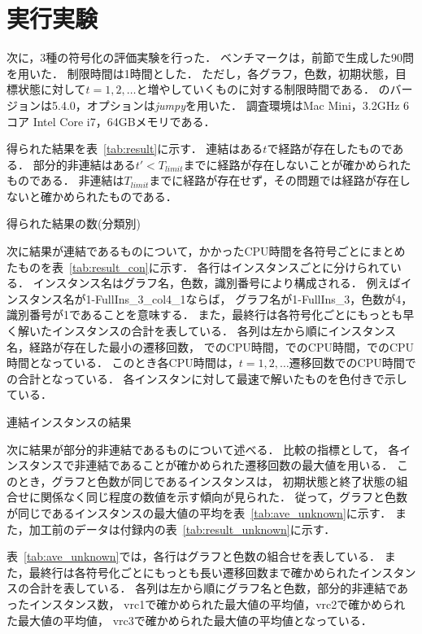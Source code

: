 \section{実行実験}
次に，3種の符号化の評価実験を行った．
ベンチマークは，前節で生成した90問を用いた．
制限時間は1時間とした．
ただし，各グラフ，色数，初期状態，目標状態に対して$t=1, 2, \dots$と増やしていくものに対する制限時間である．
{\clingo}のバージョンは5.4.0，オプションは\textsl{jumpy}を用いた．
調査環境はMac Mini，3.2GHz 6コア Intel Core i7，64GBメモリである．

得られた結果を表~\ref{tab:result}に示す．
連結はある$t$で経路が存在したものである．
部分的非連結はある$t' < T_{limit}$までに経路が存在しないことが確かめられたものである．
非連結は$T_{limit}$までに経路が存在せず，その問題では経路が存在しないと確かめられたものである．

\begin{table}
  \centering
  \caption{得られた結果の数(分類別)}
  
  \label{tab:result}
\end{table}

次に結果が連結であるものについて，かかったCPU時間を各符号ごとにまとめたものを表~\ref{tab:result_con}に示す．
各行はインスタンスごとに分けられている．
インスタンス名はグラフ名，色数，識別番号により構成される．
例えばインスタンス名が1-FullIns\_3\_col4\_1ならば，
グラフ名が1-FullIns\_3，色数が4，識別番号が1であることを意味する．
また，最終行は各符号化ごとにもっとも早く解いたインスタンスの合計を表している．
各列は左から順にインスタンス名，経路が存在した最小の遷移回数，
でのCPU時間，でのCPU時間，でのCPU時間となっている．
このとき各CPU時間は，$t=1, 2, \dots $遷移回数でのCPU時間での合計となっている．
各インスタンに対して最速で解いたものを色付きで示している．

\begin{table}
  \centering
  \caption{連結インスタンスの結果}
  
  \label{tab:result_con}
\end{table}

次に結果が部分的非連結であるものについて述べる．
比較の指標として，
各インスタンスで非連結であることが確かめられた遷移回数の最大値を用いる．
このとき，グラフと色数が同じであるインスタンスは，
初期状態と終了状態の組合せに関係なく同じ程度の数値を示す傾向が見られた．
従って，グラフと色数が同じであるインスタンスの最大値の平均を表~\ref{tab:ave_unknown}に示す．
また，加工前のデータは付録内の表~\ref{tab:result_unknown}に示す．

表~\ref{tab:ave_unknown}では，各行はグラフと色数の組合せを表している．
また，最終行は各符号化ごとにもっとも長い遷移回数まで確かめられたインスタンスの合計を表している．
各列は左から順にグラフ名と色数，部分的非連結であったインスタンス数，
vrc1で確かめられた最大値の平均値，vrc2で確かめられた最大値の平均値，
vrc3で確かめられた最大値の平均値となっている．

